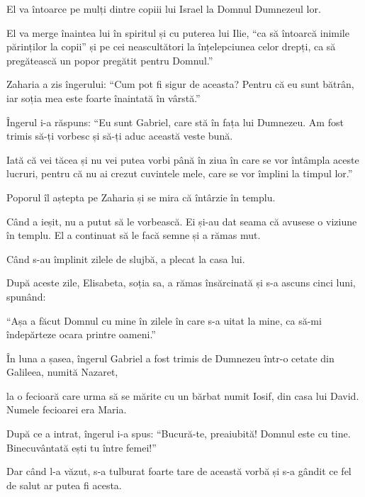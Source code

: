 {El va întoarce pe mulți dintre copiii lui Israel la Domnul Dumnezeul lor.

El va merge înaintea lui în spiritul și cu puterea lui Ilie, “ca să întoarcă inimile părinților la copii” și pe cei neascultători la înțelepciunea celor drepți, ca să pregătească un popor pregătit pentru Domnul.”


\par }{\PP {}Zaharia a zis îngerului: “Cum pot fi sigur de aceasta? Pentru că eu sunt bătrân, iar soția mea este foarte înaintată în vârstă.”


\par }{\PP {}Îngerul i-a răspuns: “Eu sunt Gabriel, care stă în fața lui Dumnezeu. Am fost trimis să-ți vorbesc și să-ți aduc această veste bună.

Iată că
vei tăcea și nu vei putea vorbi până în ziua în care se vor întâmpla aceste lucruri, pentru că nu ai crezut cuvintele mele, care se vor împlini la timpul lor.”


\par }{\PP {}Poporul îl aștepta pe Zaharia și se mira că întârzie în templu.

Când a ieșit, nu a putut să le vorbească. Ei și-au dat seama că avusese o viziune în templu. El a continuat să le facă semne și a rămas mut.

Când s-au împlinit zilele de slujbă, a plecat la casa lui.

După aceste zile, Elisabeta, soția sa, a rămas însărcinată și s-a ascuns cinci luni, spunând:

“Așa a făcut Domnul cu mine în zilele în care s-a uitat la mine, ca să-mi îndepărteze ocara printre oameni.”


\par }{\PP {}În luna a șasea, îngerul Gabriel a fost trimis de Dumnezeu într-o cetate din Galileea, numită Nazaret,

la o fecioară care urma să se mărite cu un bărbat numit Iosif, din casa lui David. Numele fecioarei era Maria.

După ce a intrat, îngerul i-a spus: “Bucură-te, preaiubită! Domnul este cu tine. Binecuvântată ești tu între femei!”


\par }{\PP {}Dar când l-a văzut, s-a tulburat foarte tare de această vorbă și s-a gândit ce fel de salut ar putea fi acesta.

}
